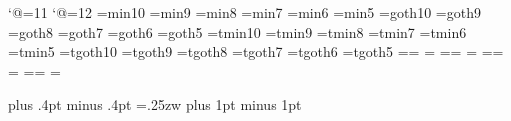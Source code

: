 %
%

\catcode`@=11 %
\def\footnote#1{\let\@sf\empty %
  \ifhmode\edef\@sf{\spacefactor\the\spacefactor}\/\fi
  \nobreak#1\@sf\vfootnote{#1}}
\catcode`@=12 %
%
\font\tenmin=min10 %
\font\preloaded=min9
\font\preloaded=min8
\font\sevenmin=min7
\font\preloaded=min6
\font\fivemin=min5
%
\font\tengt=goth10 %
\font\preloaded=goth9
\font\preloaded=goth8
\font\sevengt=goth7
\font\preloaded=goth6
\font\fivegt=goth5
%
\font\tentmin=tmin10 %
\font\preloaded=tmin9
\font\preloaded=tmin8
\font\seventmin=tmin7
\font\preloaded=tmin6
\font\fivetmin=tmin5
%
\font\tentgt=tgoth10 %
\font\preloaded=tgoth9
\font\preloaded=tgoth8
\font\seventgt=tgoth7
\font\preloaded=tgoth6
\font\fivetgt=tgoth5
%
\newfam\minfam %
\newfam\gtfam  %
\newfam\tminfam %
\newfam\tgtfam  %
%
\def\mc{\iftdir\fam\tminfam\tentmin\else\fam\minfam\tenmin\fi}%
\textfont\minfam=\tenmin\scriptfont\minfam=\sevenmin%
\scriptscriptfont\minfam=\fivemin
\textfont\tminfam=\tentmin\scriptfont\tminfam=\seventmin%
\scriptscriptfont\tminfam=\fivetmin
%
\def\gt{\iftdir\fam\tgtfam\tentgt\else\fam\gtfam\tengt\fi}%
\textfont\gtfam=\tengt\scriptfont\gtfam=\sevengt%
\scriptscriptfont\gtfam=\fivegt
\textfont\tgtfam=\tentgt\scriptfont\tgtfam=\seventgt%
\scriptscriptfont\tgtfam=\fivetgt
%

\mc		  %
\kanjiskip=0pt plus .4pt minus .4pt
\xkanjiskip=.25zw plus 1pt minus 1pt
\autospacing\autoxspacing
{}
%
\def\fmtname{ptex}
\def\fmtversion{3.14159 p1.0b}

